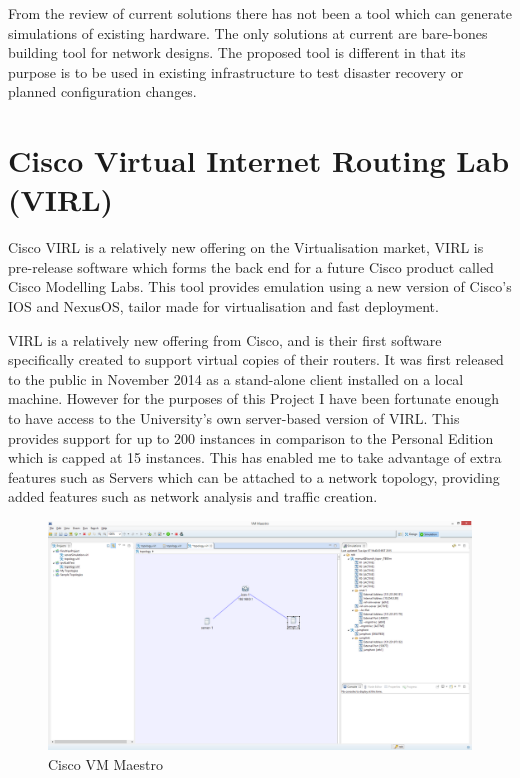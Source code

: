 \documentclass[11pt]{report}
\begin{document}
From the review of current solutions there has not been a tool which can generate simulations of existing hardware. The only solutions at current are bare-bones building tool for network designs. The proposed tool is different in that its purpose is to be used in existing infrastructure to test disaster recovery or planned configuration changes.

\section{Cisco Virtual Internet Routing Lab (VIRL)}

Cisco VIRL is a relatively new offering on the Virtualisation market, VIRL is pre-release software which forms the back end for a future Cisco product called Cisco Modelling Labs. This tool provides emulation using a new version of Cisco’s IOS and NexusOS, tailor made for virtualisation and fast deployment.

VIRL is a relatively new offering from Cisco, and is their first software specifically created to support virtual copies of their routers. It was first released to the public in November 2014 as a stand-alone client installed on a local machine. However for the purposes of this Project I have been fortunate enough to have access to the University's own server-based version of VIRL. This provides support for up to 200 instances in comparison to the Personal Edition which is capped at 15 instances. This has enabled me to take advantage of extra features such as Servers which can be attached to a network topology, providing added features such as network analysis and traffic creation.

\begin{figure}[h!]
	\caption{Cisco VM  Maestro}
	\centering
	\includegraphics[width=1\textwidth]{VIRL.png}
\end{figure}
\end{document}
